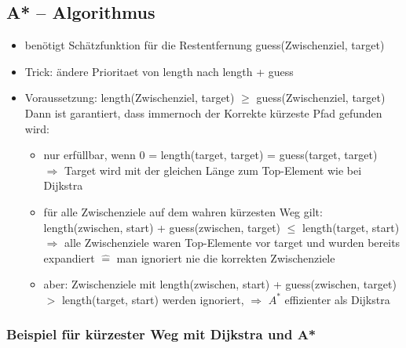         \subsection*{A* – Algorithmus}
        \begin{itemize}
            \item benötigt Schätzfunktion für die Restentfernung guess(Zwischenziel, target)
            \item Trick: ändere Prioritaet von length nach length + guess
            \item Voraussetzung: length(Zwischenziel, target) $\geq$ guess(Zwischenziel, target)\\
            Dann ist garantiert, dass immernoch der Korrekte kürzeste Pfad gefunden wird:
            \begin{itemize}
                \item nur erfüllbar, wenn 0 = length(target, target) = guess(target, target)\\
                $\Rightarrow$ Target wird mit der gleichen Länge zum Top-Element wie bei Dijkstra
                \item für alle Zwischenziele auf dem wahren kürzesten Weg gilt:\\ \hspace*{0.5cm} length(zwischen, start) + guess(zwischen, target) $\leq$ length(target, start)\\
                $\Rightarrow$ alle Zwischenziele waren Top-Elemente vor target und wurden bereits expandiert $\widehat{=}$ man ignoriert nie die korrekten Zwischenziele
                \item aber: Zwischenziele mit length(zwischen, start) + guess(zwischen, target) $>$ length(target, start) werden ignoriert, $\Rightarrow$ $A^*$ effizienter als Dijkstra
            \end{itemize}
        \end{itemize}

    \subsubsection*{Beispiel für kürzester Weg mit Dijkstra und A*}

